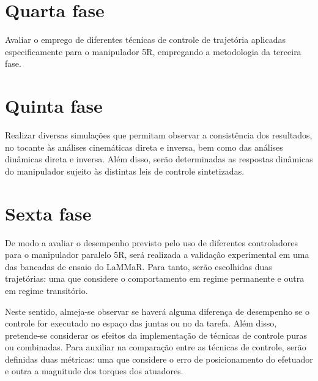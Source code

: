 \documentclass[]{politex}
\begin{document}
\section{Quarta fase} Avaliar o emprego de diferentes técnicas de controle de trajetória aplicadas especificamente para o manipulador 5R,
empregando a metodologia da terceira fase.

\section{Quinta fase} Realizar diversas simulações que permitam observar a consistência dos resultados, no tocante às análises cinemáticas direta e inversa, bem como das análises dinâmicas direta e inversa. Além disso, serão determinadas as respostas dinâmicas do manipulador sujeito às distintas leis de controle sintetizadas.

\section{Sexta fase} 
De modo a avaliar o desempenho previsto pelo uso de diferentes controladores para o manipulador paralelo 5R, será realizada a validação experimental em uma das bancadas de ensaio do LaMMaR. Para tanto, serão escolhidas duas trajetórias: uma que considere o comportamento em regime permanente e outra em regime transitório. 

Neste sentido, almeja-se observar se haverá alguma diferença de desempenho se o controle for executado no espaço das juntas ou no da tarefa. Além disso, pretende-se considerar os efeitos da implementação de técnicas de controle puras ou combinadas.
Para auxiliar na comparação entre as técnicas de controle, serão definidas duas métricas: uma que considere o erro de posicionamento do efetuador e outra a magnitude dos torques dos atuadores.

\end{document}
